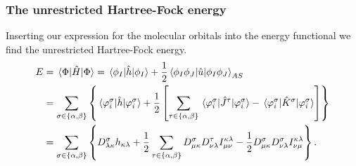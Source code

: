             \subsubsection{The unrestricted Hartree-Fock energy}
                Inserting our expression for the molecular orbitals into the
                energy functional we find the unrestricted Hartree-Fock energy.
                \begin{align}
                    E
                    &=
                    \mel{\Phi}{\hat{H}}{\Phi}
                    =
                    \mel{\phi_I}{\hat{h}}{\phi_I}
                    +
                    \frac{1}{2}
                    \mel{\phi_I\phi_J}{
                        \hat{u}}{\phi_I\phi_J}_{AS}
                    \\
                    &=
                    \sum_{\sigma \in \left\{ \alpha, \beta \right\}}\left\{ 
                        \mel{\varphi^{\sigma}_{i}}{
                            \hat{h}}{\varphi^{\sigma}_{i}}
                        + \frac{1}{2}\left[ 
                            \sum_{\tau \in \left\{ \alpha, \beta \right\}}
                            \mel{\varphi^{\sigma}_{i}}{
                                \hat{J}^{\tau}
                            }{\varphi^{\sigma}_{i}}
                            -
                            \mel{\varphi^{\sigma}_{i}}{
                                \hat{K}^{\sigma}
                            }{\varphi^{\sigma}_{i}}
                         \right]
                     \right\}
                    \\
                    &=
                    \sum_{\sigma \in \left\{ \alpha, \beta \right\}}\left\{ 
                        D^{\sigma}_{\lambda\kappa}
                        h_{\kappa\lambda}
                        + \frac{1}{2}
                        \sum_{\tau \in \left\{ \alpha, \beta \right\}}
                        D^{\sigma}_{\mu\kappa}
                        D^{\tau}_{\nu\lambda}
                        I^{\kappa\lambda}_{\mu\nu}
                        - \frac{1}{2}
                        D^{\sigma}_{\mu\kappa}
                        D^{\sigma}_{\nu\lambda}
                        I^{\kappa\lambda}_{\nu\mu}
                     \right\}.
                \end{align}

